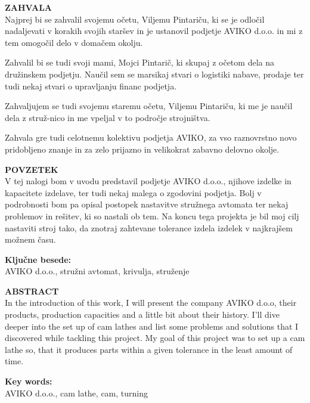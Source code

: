 \newpage
\textbf{\fontsize{14}{21}\selectfont ZAHVALA} \\
Najprej bi se zahvalil svojemu očetu, Viljemu Pintariču,
ki se je odločil nadaljevati v korakih svojih staršev in 
je ustanovil podjetje AVIKO d.o.o. in mi z tem omogočil delo
v domačem okolju.

Zahvalil bi se tudi svoji mami, Mojci Pintarič, ki skupaj z očetom
dela na družinskem podjetju. Naučil sem se marsikaj stvari o 
logistiki nabave, prodaje ter tudi nekaj stvari o upravljanju
financ podjetja.

Zahvaljujem se tudi svojemu staremu očetu, Viljemu Pintariču,
ki me je naučil dela z struž-nico in me vpeljal v to področje strojništva.

Zahvala gre tudi celotnemu kolektivu podjetja AVIKO, za vso
raznovrstno novo pridobljeno znanje in za zelo prijazno in velikokrat
zabavno delovno okolje.

\newpage
\textbf{\fontsize{14}{21}\selectfont POVZETEK} \\
V tej nalogi bom v uvodu predstavil podjetje AVIKO d.o.o.,
njihove izdelke in kapacitete izdelave, ter tudi nekaj malega
o zgodovini podjetja. Bolj v podrobnosti bom pa opisal
postopek nastavitve stružnega avtomata ter nekaj problemov in rešitev,
ki so nastali ob tem. Na koncu tega projekta je bil moj cilj
nastaviti stroj tako, da znotraj zahtevane tolerance izdela 
izdelek v najkrajšem možnem času.

\textbf{\fontsize{14}{21}\selectfont Ključne besede:} \\
\fontsize{12}{16}AVIKO d.o.o., stružni avtomat, krivulja, struženje

\newpage
\textbf{\fontsize{14}{21}\selectfont ABSTRACT} \\
In the introduction of this work, I will present the 
company AVIKO d.o.o, their products, production capacities
and a little bit about their history. I'll dive deeper into the set up of 
cam lathes and list some problems and solutions that I discovered
while tackling this project. My goal of this project was to set up 
a cam lathe so, that it produces parts within a given tolerance 
in the least amount of time.

\textbf{\fontsize{14}{21}\selectfont Key words:} \\
AVIKO d.o.o., cam lathe, cam, turning